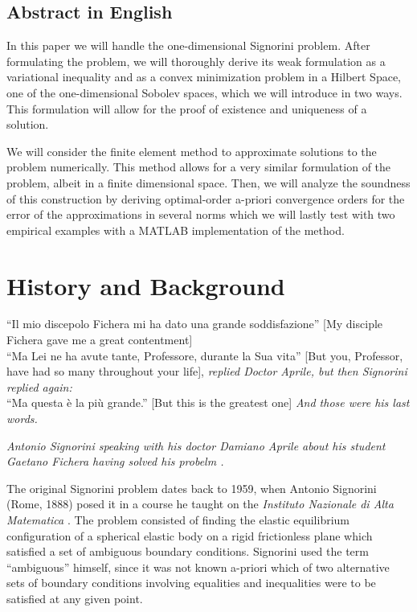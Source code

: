 \documentclass[headsepline,footsepline,footinclude=false,oneside,fontsize=11pt,paper=a4,listof=totoc,bibliography=totoc]{scrbook} %
\begin{document}
\section*{Abstract in English}
In this paper we will handle the one-dimensional Signorini problem. After formulating the problem, we will thoroughly derive its weak formulation as a variational inequality and as a convex minimization problem in a Hilbert Space, one of the one-dimensional Sobolev spaces, which we will introduce in two ways. This formulation will allow for the proof of existence and uniqueness of a solution. 

We will consider the finite element method to approximate solutions to the problem numerically. This method allows for a very similar formulation of the problem, albeit in a finite dimensional space. Then, we will analyze the soundness of this construction by deriving optimal-order a-priori convergence orders for the error of the approximations in several norms which we will lastly test with two empirical examples with a MATLAB implementation of the method.



\newpage
{}
\tableofcontents{}


\chapter{History and Background}  \setcounter{page}{1}   %
\epigraph{``Il mio discepolo Fichera mi ha dato una grande soddisfazione'' [My disciple Fichera gave me a great contentment] \\
	``Ma Lei ne ha avute tante, Professore, durante la Sua vita'' [But you, Professor, have had so many throughout your life], \textit{replied Doctor Aprile, but then Signorini replied again:} \\
	``Ma questa è la più grande.'' [But this is the greatest one] \textit{And those were his last words.}
}{\textit{Antonio Signorini speaking with his doctor Damiano Aprile about his student Gaetano Fichera having solved his probelm \cite{Fichera95}.}}

The original Signorini problem dates back to 1959, when Antonio Signorini (Rome, 1888) posed it in a course he taught on the \textit{Instituto Nazionale di Alta Matematica} \cite{signorini59}. The problem consisted of finding the elastic equilibrium configuration of a spherical elastic body on a rigid frictionless plane which satisfied a set of ambiguous boundary conditions. Signorini used the term ``ambiguous'' himself, since it was not known a-priori which of two alternative sets of boundary conditions involving equalities and inequalities were to be satisfied at any given point. 
\end{document}
